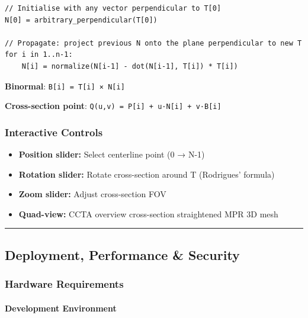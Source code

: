 \documentclass[
  11pt,
]{article}
\providecommand{\tightlist}{%
  \setlength{\itemsep}{0pt}\setlength{\parskip}{0pt}}
\begin{document}
\begin{verbatim}
// Initialise with any vector perpendicular to T[0]
N[0] = arbitrary_perpendicular(T[0])

// Propagate: project previous N onto the plane perpendicular to new T
for i in 1..n-1:
    N[i] = normalize(N[i-1] - dot(N[i-1], T[i]) * T[i])
\end{verbatim}

\textbf{Binormal}: \texttt{B{[}i{]}\ =\ T{[}i{]}\ ×\ N{[}i{]}}

\textbf{Cross-section point}:
\texttt{Q(u,v)\ =\ P{[}i{]}\ +\ u·N{[}i{]}\ +\ v·B{[}i{]}}

\subsubsection{Interactive Controls}\label{interactive-controls}

\begin{itemize}
\tightlist
\item
  \textbf{Position slider:} Select centerline point (0 → N-1)
\item
  \textbf{Rotation slider:} Rotate cross-section around T (Rodrigues'
  formula)
\item
  \textbf{Zoom slider:} Adjust cross-section FOV
\item
  \textbf{Quad-view:} CCTA overview \textbar{} cross-section \textbar{}
  straightened MPR \textbar{} 3D mesh
\end{itemize}

\begin{center}\rule{0.5\linewidth}{0.5pt}\end{center}

\subsection{Deployment, Performance \&
Security}\label{deployment-performance-security}

\subsubsection{Hardware Requirements}\label{hardware-requirements}

\paragraph{Development Environment}\label{development-environment}
\end{document}

